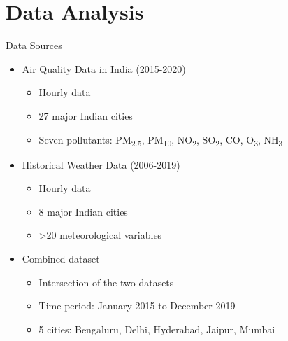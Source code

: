\documentclass[svgnames, 12pt]{beamer}
\begin{document}
\section{Data Analysis}

\begin{frame}{Data Sources}
    \begin{itemize}
       \item Air Quality Data in India (2015-2020)
           \begin{itemize}
               \item Hourly data
               \item 27 major Indian cities
               \item Seven pollutants: PM\textsubscript{2.5}, PM\textsubscript{10}, NO\textsubscript{2}, SO\textsubscript{2}, CO, O\textsubscript{3}, NH\textsubscript{3}
           \end{itemize}
       \vspace{0.5em}
       \item Historical Weather Data (2006-2019)
           \begin{itemize}
               \item Hourly data
               \item 8 major Indian cities
               \item >20 meteorological variables
           \end{itemize}
       \vspace{0.5em}
       \item Combined dataset
           \begin{itemize}
               \item Intersection of the two datasets
               \item Time period: January 2015 to December 2019
               \item 5 cities: Bengaluru, Delhi, Hyderabad, Jaipur, Mumbai
           \end{itemize}
    \end{itemize}
    \vfill
\end{frame}
\end{document}
